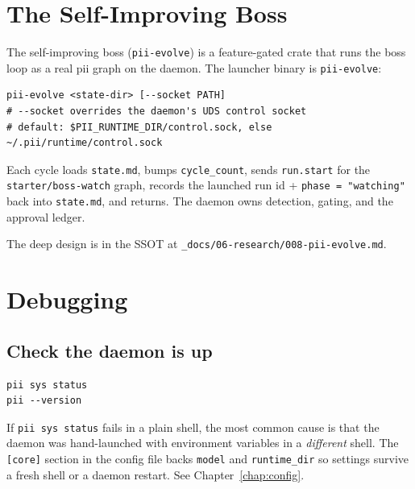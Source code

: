 \documentclass[
	fontsize=10pt,
	twoside=false,
	secnumdepth=2,
	open=any,
]{kaobook}
\begin{document}
\chapter{The Self-Improving Boss}
\label{chap:evolve}

The self-improving boss (\texttt{pii-evolve}) is a feature-gated crate
that runs the boss loop as a real pii graph on the daemon. The launcher
binary is \texttt{pii-evolve}:

\begin{cmdbox}
\begin{lstlisting}
pii-evolve <state-dir> [--socket PATH]
# --socket overrides the daemon's UDS control socket
# default: $PII_RUNTIME_DIR/control.sock, else ~/.pii/runtime/control.sock
\end{lstlisting}
\end{cmdbox}

Each cycle loads \texttt{state.md}, bumps \texttt{cycle\_count}, sends
\texttt{run.start} for the \texttt{starter/boss-watch} graph, records the
launched run id + \texttt{phase = "watching"} back into \texttt{state.md},
and returns. The daemon owns detection, gating, and the approval ledger.

The deep design is in the SSOT at
\texttt{\_docs/06-research/008-pii-evolve.md}.

\chapter{Debugging}
\label{chap:debug}

\section{Check the daemon is up}

\begin{cmdbox}[Status]
\begin{lstlisting}
pii sys status
pii --version
\end{lstlisting}
\end{cmdbox}

If \texttt{pii sys status} fails in a plain shell, the most common cause
is that the daemon was hand-launched with environment variables in a
\emph{different} shell. The \texttt{[core]} section in the config file
backs \texttt{model} and \texttt{runtime\_dir} so settings survive a fresh
shell or a daemon restart. See Chapter~\ref{chap:config}.
\end{document}
